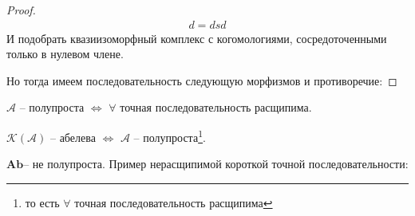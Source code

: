 \begin{to_ex}
\begin{proof}
\begin{align*}
    d = dsd
\end{align*}
И подобрать квазиизоморфный комплекс с когомологиями, сосредоточенными только в нулевом члене.
\bee
{}
\eee
Но тогда имеем последовательность следующую морфизмов и противоречие:
\bee
{}
\eee
\end{proof}
\end{to_ex}
\begin{to_def}
$\mathcal{A}$ -- полупроста $\Leftrightarrow$ $\forall$ точная последовательность расщипима.
\end{to_def}
\begin{to_claim}
$\mathcal{K(A)}$ -- абелева $\Leftrightarrow$ $\mathcal{A}$ -- полупроста\footnote{то есть $\forall$ точная последовательность расщипима}.
\end{to_claim}
\begin{to_ex}
$\mathbf{Ab}$-- не полупроста. Пример нерасщипимой короткой точной последовательности:
\bee
{}
\eee
\end{to_ex}